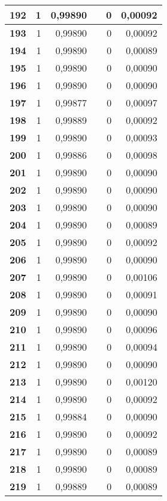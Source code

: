 {\begin{longtable}{|r|r|r|l|r|r|}
\textbf{192} & 1 & 0,99890 &  & 0 & 0,00092 \\ \hline
\textbf{193} & 1 & 0,99890 &  & 0 & 0,00092 \\ \hline
\textbf{194} & 1 & 0,99890 &  & 0 & 0,00089 \\ \hline
\textbf{195} & 1 & 0,99890 &  & 0 & 0,00090 \\ \hline
\textbf{196} & 1 & 0,99890 &  & 0 & 0,00090 \\ \hline
\textbf{197} & 1 & 0,99877 &  & 0 & 0,00097 \\ \hline
\textbf{198} & 1 & 0,99889 &  & 0 & 0,00092 \\ \hline
\textbf{199} & 1 & 0,99890 &  & 0 & 0,00093 \\ \hline
\textbf{200} & 1 & 0,99886 &  & 0 & 0,00098 \\ \hline
\textbf{201} & 1 & 0,99890 &  & 0 & 0,00090 \\ \hline
\textbf{202} & 1 & 0,99890 &  & 0 & 0,00090 \\ \hline
\textbf{203} & 1 & 0,99890 &  & 0 & 0,00090 \\ \hline
\textbf{204} & 1 & 0,99890 &  & 0 & 0,00089 \\ \hline
\textbf{205} & 1 & 0,99890 &  & 0 & 0,00092 \\ \hline
\textbf{206} & 1 & 0,99890 &  & 0 & 0,00090 \\ \hline
\textbf{207} & 1 & 0,99890 &  & 0 & 0,00106 \\ \hline
\textbf{208} & 1 & 0,99890 &  & 0 & 0,00091 \\ \hline
\textbf{209} & 1 & 0,99890 &  & 0 & 0,00090 \\ \hline
\textbf{210} & 1 & 0,99890 &  & 0 & 0,00096 \\ \hline
\textbf{211} & 1 & 0,99890 &  & 0 & 0,00094 \\ \hline
\textbf{212} & 1 & 0,99890 &  & 0 & 0,00090 \\ \hline
\textbf{213} & 1 & 0,99890 &  & 0 & 0,00120 \\ \hline
\textbf{214} & 1 & 0,99890 &  & 0 & 0,00092 \\ \hline
\textbf{215} & 1 & 0,99884 &  & 0 & 0,00090 \\ \hline
\textbf{216} & 1 & 0,99890 &  & 0 & 0,00092 \\ \hline
\textbf{217} & 1 & 0,99890 &  & 0 & 0,00089 \\ \hline
\textbf{218} & 1 & 0,99890 &  & 0 & 0,00089 \\ \hline
\textbf{219} & 1 & 0,99889 &  & 0 & 0,00089 \\ \hline

\end{longtable}}
